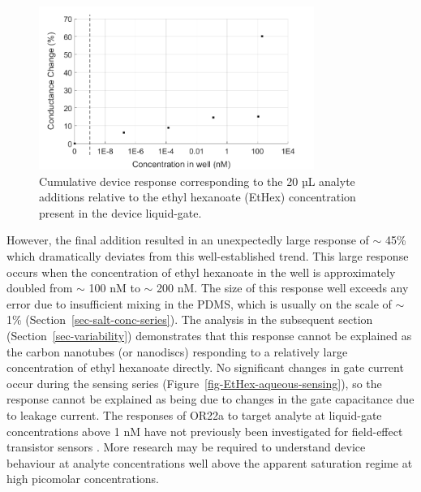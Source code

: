 \documentclass[
  a4paper,
]{scrbook}
\begin{document}
\begin{figure}

{\centering \includegraphics[width=0.8\textwidth,height=\textheight]{figures/ch7/concentrations.png}

}

\caption[Cumulative device response corresponding to the 20 µL analyte
additions relative to the ethyl hexanoate (EtHex) concentration present
in the device liquid-gate.]{\label{fig-EtHex-responses}Cumulative device
response corresponding to the 20 µL analyte additions relative to the
ethyl hexanoate (EtHex) concentration present in the device
liquid-gate.}

\end{figure}

However, the final addition resulted in an unexpectedly large response
of \(\sim\) 45\% which dramatically deviates from this well-established
trend. This large response occurs when the concentration of ethyl
hexanoate in the well is approximately doubled from \(\sim\) 100 nM to
\(\sim\) 200 nM. The size of this response well exceeds any error due to
insufficient mixing in the PDMS, which is usually on the scale of
\(\sim\) 1\% (Section~\ref{sec-salt-conc-series}). The analysis in the
subsequent section (Section~\ref{sec-variability}) demonstrates that
this response cannot be explained as the carbon nanotubes (or nanodiscs)
responding to a relatively large concentration of ethyl hexanoate
directly. No significant changes in gate current occur during the
sensing series (Figure~\ref{fig-EtHex-aqueous-sensing}), so the response
cannot be explained as being due to changes in the gate capacitance due
to leakage current. The responses of OR22a to target analyte at
liquid-gate concentrations above 1 nM have not previously been
investigated for field-effect transistor sensors
\autocite{Murugathas2019a,Murugathas2020}. More research may be required
to understand device behaviour at analyte concentrations well above the
apparent saturation regime at high picomolar concentrations.
\end{document}
